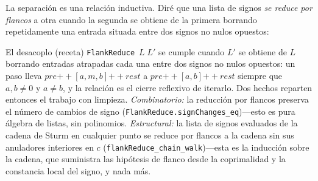 \documentclass[11pt]{article}
\newcommand{\lean}[1]{\texttt{#1}}
\begin{document}
La separaci\'on es una relaci\'on inductiva. Dir\'e que una lista de signos \emph{se reduce por
flancos} a otra cuando la segunda se obtiene de la primera borrando repetidamente una entrada situada
entre dos signos no nulos opuestos:
\begin{recipebox}{El desacoplo (receta)}
\lean{FlankReduce}~$L\;L'$ se cumple cuando $L'$ se obtiene de $L$ borrando entradas atrapadas cada
una entre dos signos no nulos opuestos: un paso lleva
$\textit{pre}\mathbin{+\!\!+}[a,m,b]\mathbin{+\!\!+}\textit{rest}$ a
$\textit{pre}\mathbin{+\!\!+}[a,b]\mathbin{+\!\!+}\textit{rest}$ siempre que $a,b\ne0$ y $a\ne b$, y
la relaci\'on es el cierre reflexivo de iterarlo. Dos hechos reparten entonces el trabajo con
limpieza. \emph{Combinatorio:} la reducci\'on por flancos
preserva el n\'umero de cambios de signo (\lean{FlankReduce.signChanges\_eq})---esto es pura
\'algebra de listas, sin polinomios. \emph{Estructural:} la lista de signos evaluados de la cadena de
Sturm en cualquier punto se reduce por flancos a la cadena sin sus anuladores interiores en $c$
(\lean{flankReduce\_chain\_walk})---esta es la inducci\'on sobre la cadena, que suministra las
hip\'otesis de flanco desde la coprimalidad y la constancia local del signo, y nada m\'as.
\end{recipebox}
\end{document}
